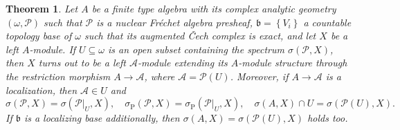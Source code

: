 \documentclass[12pt]{amsart}%
\newtheorem{theorem}{Theorem}
\theoremstyle{plain}
\numberwithin{equation}{section}
\numberwithin{equation}{section}
\numberwithin{theorem}{section}
\numberwithin{lemma}{section}
\numberwithin{remark}{section}
\numberwithin{example}{section}
\numberwithin{proposition}{section}
\numberwithin{definition}{section}
\numberwithin{corollary}{section}
\begin{document}
\begin{theorem}
\label{corkeyy2}Let $A$ be a finite type algebra with its complex analytic
geometry $\left(  \omega,\mathcal{P}\right)  $ such that $\mathcal{P}$ is a
nuclear Fr\'{e}chet algebra presheaf, $\mathfrak{b}=\left\{  V_{i}\right\}  $
a countable topology base of $\omega$ such that its augmented \v{C}ech complex
is exact, \textit{and let }$X$ be a left $A$-module. If $U\subseteq\omega$ is
an open subset containing the spectrum $\sigma\left(  \mathcal{P},X\right)  $,
then $X$ turns out to be a left $\mathcal{A}$-module extending its $A$-module
structure through the restriction morphism $A\rightarrow\mathcal{A}$, where
$\mathcal{A=P}\left(  U\right)  $. Moreover, if $A\rightarrow\mathcal{A}$ is a
localization, then $\mathcal{A}\in U$ and%
\[
\sigma\left(  \mathcal{P},X\right)  =\sigma\left(  \mathcal{P}|_{U},X\right)
,\quad\sigma_{\operatorname{P}}\left(  \mathcal{P},X\right)  =\sigma
_{\operatorname{P}}\left(  \mathcal{P}|_{U},X\right)  ,\quad\sigma\left(
A,X\right)  \cap U=\sigma\left(  \mathcal{P}\left(  U\right)  ,X\right)  .
\]
If $\mathfrak{b}$ is a localizing base additionally, then $\sigma\left(
A,X\right)  =\sigma\left(  \mathcal{P}\left(  U\right)  ,X\right)  $ holds too.
\end{theorem}
\end{document}

